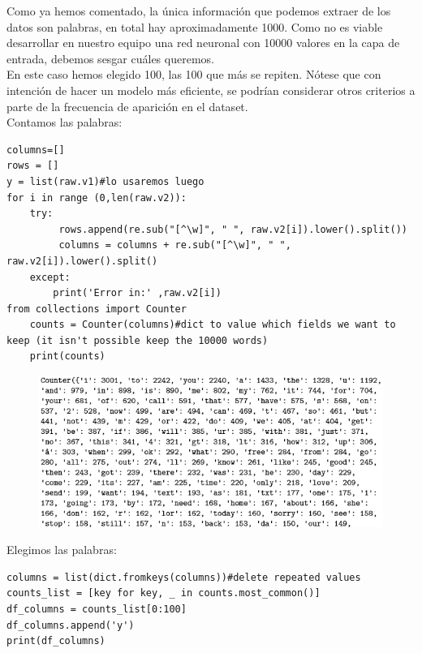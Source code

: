 \documentclass[a4paper,10pt]{article}
\begin{document}
Como ya hemos comentado, la única información que podemos extraer de los datos son palabras, en total hay aproximadamente 1000. Como no es viable desarrollar en nuestro equipo una red neuronal con 10000 valores en la capa de entrada, debemos sesgar cuáles queremos.\\ En este caso hemos elegido 100, las 100 que más se repiten. Nótese que con intención de hacer un modelo más eficiente, se podrían considerar otros criterios a parte de la frecuencia de aparición en el dataset.\\
Contamos las palabras:
\begin{lstlisting}
columns=[] 
rows = [] 
y = list(raw.v1)#lo usaremos luego 
for i in range (0,len(raw.v2)): 
    try:
         rows.append(re.sub("[^\w]", " ", raw.v2[i]).lower().split()) 
         columns = columns + re.sub("[^\w]", " ", raw.v2[i]).lower().split() 
    except: 
        print('Error in:' ,raw.v2[i])
from collections import Counter 
    counts = Counter(columns)#dict to value which fields we want to keep (it isn't possible keep the 10000 words)
    print(counts)
\end{lstlisting}
\begin{figure}[H]
\centering
\includegraphics{Annotation 2020-03-23 182424.png}
\end{figure}
Elegimos las palabras:
\begin{lstlisting}
columns = list(dict.fromkeys(columns))#delete repeated values 
counts_list = [key for key, _ in counts.most_common()] 
df_columns = counts_list[0:100] 
df_columns.append('y') 
print(df_columns)
\end{lstlisting}
\end{document}

